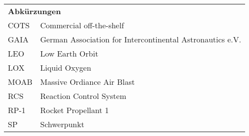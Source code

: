\begin{longtable}[l]{ll}
	\multicolumn{2}{l}{\textbf{Abkürzungen}}\\
	COTS&Commercial off-the-shelf\\
	GAIA&German Association for Intercontinental Astronautics e.V.\\
	LEO&Low Earth Orbit\\
	LOX&Liquid Oxygen\\
	MOAB&Massive Ordiance Air Blast\\
	RCS&Reaction Control System\\
	RP-1&Rocket Propellant 1\\
	SP&Schwerpunkt\\
\end{longtable}